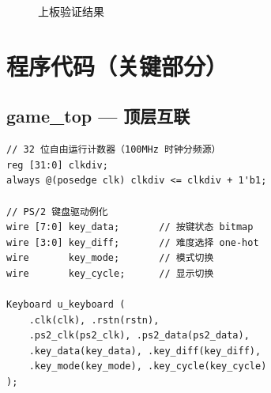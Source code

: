 \documentclass[12pt,a4paper]{ctexart}
\begin{document}
\begin{figure}[H]
\centering
%
%
\caption{上板验证结果}
\label{fig:verify}
\end{figure}


\section{程序代码（关键部分）}


\subsection{game\_top --- 顶层互联}

\begin{lstlisting}
// 32 位自由运行计数器（100MHz 时钟分频源）
reg [31:0] clkdiv;
always @(posedge clk) clkdiv <= clkdiv + 1'b1;

// PS/2 键盘驱动例化
wire [7:0] key_data;       // 按键状态 bitmap
wire [3:0] key_diff;       // 难度选择 one-hot
wire       key_mode;       // 模式切换
wire       key_cycle;      // 显示切换

Keyboard u_keyboard (
    .clk(clk), .rstn(rstn),
    .ps2_clk(ps2_clk), .ps2_data(ps2_data),
    .key_data(key_data), .key_diff(key_diff),
    .key_mode(key_mode), .key_cycle(key_cycle)
);
\end{lstlisting}
\end{document}
